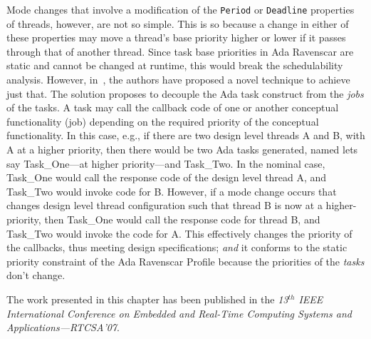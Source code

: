 Mode changes that involve a modification of the \texttt{Period} or
\texttt{Deadline} properties of threads, however, are not so
simple. This is so because a change in either of these properties may
move a thread's base priority higher or lower if it passes through
that of another thread. Since task base priorities in Ada Ravenscar
are static and cannot be changed at runtime, this would break the
schedulability analysis. However, in~\cite{puente@adalett01}, the
authors have proposed a novel technique to achieve just that. The
solution proposes to decouple the Ada task construct from the
\emph{jobs} of the tasks. A task may call the callback code of one or
another conceptual functionality (job) depending on the required
priority of the conceptual functionality. In this case, e.g., if there
are two design level threads A and B, with A at a higher priority,
then there would be two Ada tasks generated, named lets say
Task\_One---at higher priority---and Task\_Two. In the nominal case,
Task\_One would call the response code of the design level thread A,
and Task\_Two would invoke code for B. However, if a mode change
occurs that changes design level thread configuration such that thread
B is now at a higher-priority, then Task\_One would call the response
code for thread B, and Task\_Two would invoke the code for A. This
effectively changes the priority of the callbacks, thus meeting design
specifications; \emph{and} it conforms to the static priority
constraint of the Ada Ravenscar Profile because the priorities of the
\emph{tasks} don't change.

The work presented in this chapter has been published in the
\emph{13$^{th}$ IEEE International Conference on Embedded and
  Real-Time Computing Systems and Applications---RTCSA'07}.


